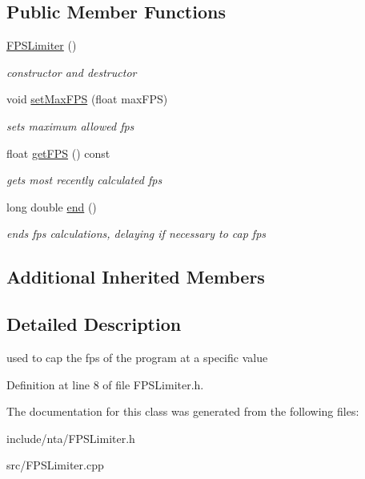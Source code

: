 \subsection*{Public Member Functions}
\begin{DoxyCompactItemize}
\item 
\mbox{\label{classnta_1_1FPSLimiter_a7a866e0bc883bdd26e80e95748f4052c}} 
\hyperlink{classnta_1_1FPSLimiter_a7a866e0bc883bdd26e80e95748f4052c}{F\+P\+S\+Limiter} ()
\begin{DoxyCompactList}\small\item\em constructor and destructor \end{DoxyCompactList}\item 
\mbox{\label{classnta_1_1FPSLimiter_ac72ab398095957d9cffa07859e1f97a4}} 
void \hyperlink{classnta_1_1FPSLimiter_ac72ab398095957d9cffa07859e1f97a4}{set\+Max\+F\+PS} (float max\+F\+PS)
\begin{DoxyCompactList}\small\item\em sets maximum allowed fps \end{DoxyCompactList}\item 
\mbox{\label{classnta_1_1FPSLimiter_a682d191b70ddecf8f7ed776dc586fe27}} 
float \hyperlink{classnta_1_1FPSLimiter_a682d191b70ddecf8f7ed776dc586fe27}{get\+F\+PS} () const
\begin{DoxyCompactList}\small\item\em gets most recently calculated fps \end{DoxyCompactList}\item 
\mbox{\label{classnta_1_1FPSLimiter_a17003ecbc30d60c58112615fcaee4d1e}} 
long double \hyperlink{classnta_1_1FPSLimiter_a17003ecbc30d60c58112615fcaee4d1e}{end} ()
\begin{DoxyCompactList}\small\item\em ends fps calculations, delaying if necessary to cap fps \end{DoxyCompactList}\end{DoxyCompactItemize}
\subsection*{Additional Inherited Members}


\subsection{Detailed Description}
used to cap the fps of the program at a specific value 

Definition at line 8 of file F\+P\+S\+Limiter.\+h.



The documentation for this class was generated from the following files\+:\begin{DoxyCompactItemize}
\item 
include/nta/F\+P\+S\+Limiter.\+h\item 
src/F\+P\+S\+Limiter.\+cpp\end{DoxyCompactItemize}
